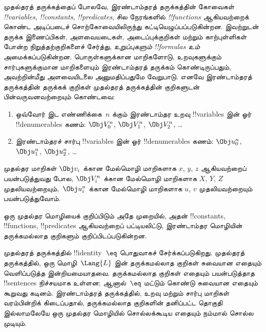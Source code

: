 \documentclass[../../../include/open-logic-section]{subfiles}
\begin{document}



முதல்தரத் தருக்கத்தைப் போலவே, இரண்டாம்தரத் தருக்கத்தின் கோவைகள்
\emph{!!{variable}s}, \emph{!!{constant}s}, \emph{!!{predicate}s},
சில நேரங்களில் \emph{!!{function}s} ஆகியவற்றைக் கொண்ட அடிப்படைச்
சொற்கோவையிலிருந்து கட்டியெழுப்பப்படுகின்றன. இவற்றுடன் தருக்க
இணைப்பிகள், அளவையடைகள், அடைப்புக்குறிகள் மற்றும் காற்புள்ளிகள் போன்ற
நிறுத்தற்குறிகளைச் சேர்த்து, \emph{உறுப்புகளும்}
\emph{!!{formula}s உம்} அமைக்கப்படுகின்றன. பொருள்களுக்கான மாறிகளோடு,
உறவுகளுக்கும் சார்புகளுக்குமான மாறிகளையும் இரண்டாம்தரத் தருக்கம்
கொண்டிருப்பதும், அவற்றின்மீது அளவையிடலை அனுமதிப்பதுமே வேறுபாடு.
எனவே இரண்டாம்தரத் தருக்கத்தின் தருக்கக் குறிகள் முதல்தரத்
தருக்கத்தின் குறிகளுடன் பின்வருவனவற்றையும் கொண்டவை:

\begin{enumerate}
\item ஒவ்வோர் இட எண்ணிக்கை~$n$ க்கும் இரண்டாம்தர உறவு
  !!{variable}s இன் ஓர் !!{denumerable}s கணம்:
  $\Obj V_0^n$, $\Obj V_1^n$, $\Obj V_2^n$, \dots
\item இரண்டாம்தரச் சார்பு !!{variable}s இன் ஓர் !!{denumerable}s கணம்:
  $\Obj u_0^n$, $\Obj u_1^n$, $\Obj u_2^n$, \dots
\end{enumerate}

முதல்தர மாறிகள் $\Obj v_i$ க்கான மேல்மொழி மாறிகளாக $x$, $y$, $z$
ஆகியவற்றைப் பயன்படுத்துவது போல, $\Obj V_i^n$ க்கான மேல்மொழி
மாறிகளாக $X$, $Y$, $Z$ முதலியவற்றையும்,~$\Obj u_i^n$ க்கான
மேல்மொழி மாறிகளாக $u$, $v$ முதலியவற்றையும் பயன்படுத்துவோம்.

\begin{explain}
ஒரு முதல்தர மொழியைக் குறிப்பிடும் அதே முறையில், அதன் !!{constant}s,
!!{function}s, !!{predicate}s ஆகியவற்றைப் பட்டியலிட்டு, இரண்டாம்தர
மொழியின் தருக்கமல்லாத குறிகளும் குறிப்பிடப்படுகின்றன.

முதல்தரத் தருக்கத்தில் !!{identity}~$\eq$ பொதுவாகச் சேர்க்கப்படுகிறது.
முதல்தரத் தருக்கத்தில், ஒரு மொழி~$\Lang{L}$ இன் தருக்கமல்லாத குறிகள்
சுவையான எதையும் வெளிப்படுத்த இன்றியமையாதவை. தருக்கமல்லாத குறிகள்
எதையும் பயன்படுத்தாத !!{sentence}s நிச்சயமாக உள்ளன; ஆனால்~$\eq$
மட்டும் கொண்டு சுவையான எதையும் கூறுவது கடினம். இரண்டாம்தரத்
தருக்கத்தில், உறவு மற்றும் சார்பு மாறிகள் வரம்பின்றிக் கிடைப்பதால்,
தருக்கமல்லாத குறிகளின் தனிப்பட்ட தொகுதி இல்லாமலேயே ஒரு முதல்தர
மொழியில் சொல்லக்கூடிய எதையும் நம்மால் சொல்ல முடியும்.
\end{explain}
\end{document}
